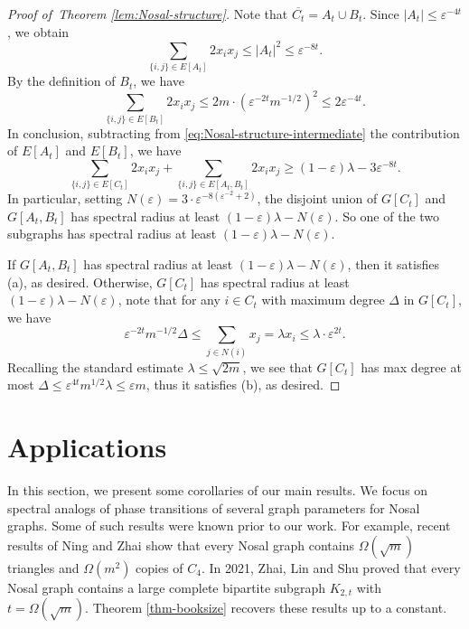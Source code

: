 \documentclass[11pt,a4paper]{article}
\theoremstyle{definition}
\theoremstyle{remark}
\newcommand*{\abs}[1]{\lvert#1\rvert}
\begin{document}
\begin{proof}[Proof of~Theorem \ref{lem:Nosal-structure}]
    Note that $\overline{C_t} = A_t \cup B_t$. Since $\abs{A_{t}} \leq \varepsilon^{-4t}$, we obtain 
    $$\sum_{\{i, j\} \in E[A_t]} 2x_i x_j \leq \abs{A_t}^2 \leq \varepsilon^{-8t}.$$
    By the definition of $B_t$, we have
    $$\sum_{\{i,j\} \in E[B_t]} 2x_i x_j \leq 2m \cdot \left(\varepsilon^{-2t} m^{-1/2}\right)^2 \leq 2 \varepsilon^{-4t}.$$
    In conclusion, subtracting from \eqref{eq:Nosal-structure-intermediate} the contribution of $E[A_t]$ and $E[B_t]$, we have
    $$\sum_{\{i,j\} \in E[C_t]} 2x_i x_j 
    + \sum_{\{i,j\} \in E[A_t, B_t]} 2x_i x_j \geq (1 - \varepsilon) \lambda - 3 \varepsilon^{-8t}.$$
    In particular, setting $N(\varepsilon) = 3 \cdot \varepsilon^{-8(\varepsilon^{-2} + 2)}$, the disjoint union of $G[C_t]$ and $G[A_t, B_t]$ has spectral radius at least $(1 - \varepsilon) \lambda - N(\varepsilon)$. So one of the two subgraphs has spectral radius at least $(1 - \varepsilon) \lambda - N(\varepsilon)$.

    If $G[A_t, B_t]$ has spectral radius at least $(1 - \varepsilon) \lambda - N(\varepsilon)$, then it satisfies (a), as desired. Otherwise, $G[C_t]$ has spectral radius at least $(1 - \varepsilon) \lambda - N(\varepsilon)$, note that for any $i \in C_t$ with maximum degree $\Delta$ in $G[C_t]$, we have
    $$\varepsilon^{-2t} m^{-1/2} \Delta \leq \sum_{j \in N(i)} x_j = \lambda x_i \leq \lambda \cdot \varepsilon^{2t}.$$
    Recalling the standard estimate $\lambda\le \sqrt{2m}$, we see that $G[C_t]$ has max degree at most $\Delta\le \varepsilon^{4t} m^{1/2} \lambda \leq \varepsilon m$, thus it satisfies (b), as desired. 
\end{proof}





\section{Applications}\label{sec-5}

In this section, we present some corollaries of our main results. We focus on spectral analogs of phase transitions of several graph parameters for Nosal graphs. Some of such results were known prior to our work. For example, recent results of Ning and Zhai \cite{NZ2021, NZ2021b} show that every Nosal graph contains $\Omega (\sqrt{m})$ triangles and $\Omega(m^2)$ copies of $C_4$. In 2021, Zhai, Lin and Shu \cite{ZLS2021} 
proved that every Nosal graph contains a large complete bipartite subgraph $K_{2, t}$ with $t = \Omega(\sqrt{m})$. Theorem \ref{thm-booksize} recovers these results up to a constant. 
\end{document}
